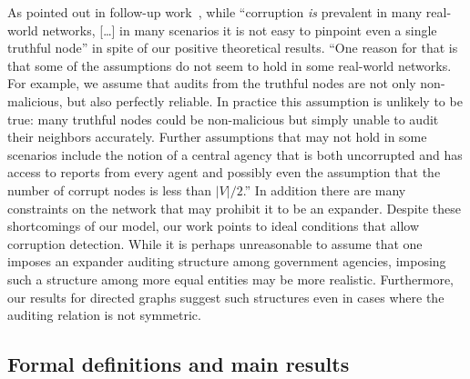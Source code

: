 \documentclass[11pt]{article}
\numberwithin{equation}{section}
\theoremstyle{definition}
\theoremstyle{plain}
\begin{document}
As pointed out in
%
follow-up    %
work~\cite{JiMoRa:18}, while 
%
%
%
%
%
%
%
%
``corruption \emph{is} prevalent in many real-world networks, 
%
[\dots]    %
in many scenarios it is not easy to pinpoint even a single 
truthful node'' in spite of our positive theoretical results.
``One reason for that is that some of the 
assumptions do not seem to hold in some 
%
real-world     %
networks. For example, we assume that audits from the truthful nodes are not only non-malicious, but also perfectly reliable. In practice this assumption is unlikely to be true: many truthful nodes could be non-malicious but simply unable to audit their neighbors accurately. Further assumptions that may not hold in some scenarios include the notion of a central agency that is both uncorrupted and has access to reports from every
%
agent      %
and possibly even the assumption that the number of corrupt nodes is less than $|V| / 2$.'' 
In addition there are many constraints on the network that may prohibit it to be an expander. 
Despite these shortcomings of our model, our work points to ideal conditions that allow corruption detection. 
While it is perhaps unreasonable to assume that one imposes an expander auditing structure among government agencies, imposing such a structure 
among more equal entities
%
%
may be more realistic. Furthermore, our results for directed graphs suggest
such structures even in cases where the auditing relation is not symmetric.  


\subsection{Formal definitions and main results} 
\end{document}
